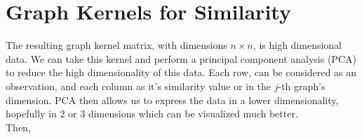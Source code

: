 %
%
%

\section{Graph Kernels for Similarity}

The resulting graph kernel matrix, with dimensions $n \times n$, is high dimensional data. We can take this kernel and perform a principal component analysis (PCA) to reduce the high dimensionality of this data. Each row, can be considered as an observation, and each column as it's similarity value or in the $j$-th graph's dimension. PCA then allows us to express the data in a lower dimensionality, hopefully in 2 or 3 dimensions which can be visualized much better. \\
Then, 
